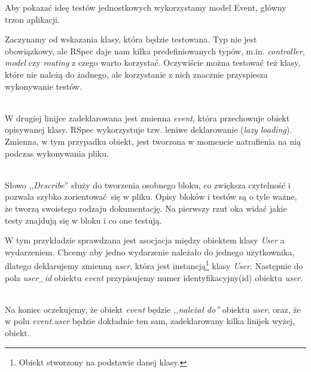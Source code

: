 Aby pokazać ideę testów jednostkowych wykorzystamy model Event, główny trzon aplikacji.

Zaczynamy od wskazania klasy, która będzie testowana. Typ nie jest obowiązkowy, ale RSpec daje nam kilka predefiniowanych typów, m.in. \emph{controller}, \emph{model} czy \emph{routing} z czego warto korzystać. Oczywiście można testować też klasy, które nie należą do żadnego, ale korzystanie z nich znacznie przyspiesza wykonywanie testów.

\begin{code}
	
\end{code}\\

W drugiej linijce zadeklarowana jest zmienna \emph{event}, która przechowuje obiekt opisywanej klasy. RSpec wykorzystuje tzw. leniwe deklarowanie (\emph{lazy loading}). Zmienna, w tym przypadku obiekt, jest tworzona w momencie natrafienia na nią podczas wykonywania pliku.

\begin{code}
	
\end{code}\\

Słowo ,,\emph{Describe}'' służy do tworzenia osobnego bloku, co zwiększa czytelność i~ pozwala szybko zorientować się w pliku. Opisy bloków i testów są o tyle ważne, że tworzą swoistego rodzaju dokumentację. Na pierwszy rzut oka widać jakie testy znajdują się w bloku i co one testują.

W tym przykładzie sprawdzana jest asocjacja między obiektem klasy \emph{User} a~ wydarzeniem. Chcemy aby jedno wydarzenie należało do jednego użytkownika, dlatego deklarujemy zmienną \emph{user}, która jest instancją\footnote{Obiekt stworzony na podstawie danej klasy.} klasy \emph{User}. Następnie do pola \emph{user\_id} obiektu \emph{event} przypisujemy numer identyfikacyjny(id) obiektu \emph{user}.

\begin{code}
	
\end{code}\\

Na koniec oczekujemy, że obiekt \emph{event} będzie \emph{,,należał do''} obiektu \emph{user}, oraz, że w polu \emph{event.user} będzie dokładnie ten sam, zadeklarowany kilka linijek wyżej, obiekt.

